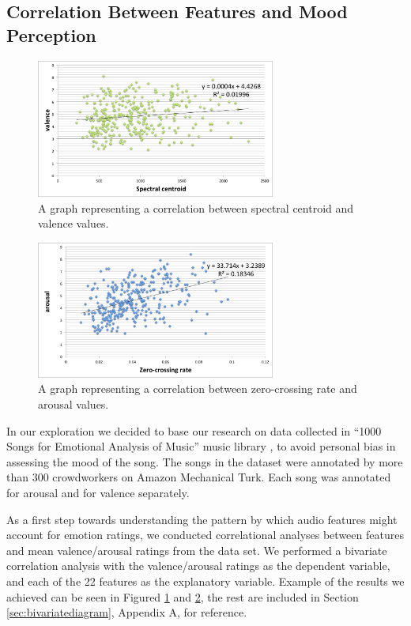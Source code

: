 \newpage
\vspace{10pt}


\subsection{Correlation Between Features and Mood Perception}


\begin{figure}[b]
	\centering
   \includegraphics[width=0.7\textwidth]{Figures/spectralcentroid-valence}
\caption{A graph representing a correlation between spectral centroid and valence values.}
\label{fig:bivariate-valence}
\end{figure}


\begin{figure}[b]
	\centering
   \includegraphics[width=0.7\textwidth]{Figures/zerocrossing-arousal}
 \caption{A graph representing a correlation between zero-crossing rate and arousal values.}
\label{fig:bivariate-arousal}
\end{figure}


In our exploration we decided to base our research on data collected in ``1000 Songs for Emotional Analysis of Music'' music library \cite{1000songs}, to avoid personal bias in assessing the mood of the song. The songs in the dataset were annotated by more than 300 crowdworkers on Amazon Mechanical Turk. Each song was annotated for arousal and for valence separately.

As a first step towards understanding the pattern by which audio features might account for emotion ratings, we conducted correlational analyses between features and mean valence/arousal ratings from the data set. We performed a bivariate correlation analysis with the valence/arousal ratings as the dependent variable, and each of the 22 features as the explanatory variable. Example of the results we achieved can be seen in Figured \ref{fig:bivariate-valence} and \ref{fig:bivariate-arousal}, the rest are included in Section \ref{sec:bivariatediagram}, Appendix A, for reference. 

